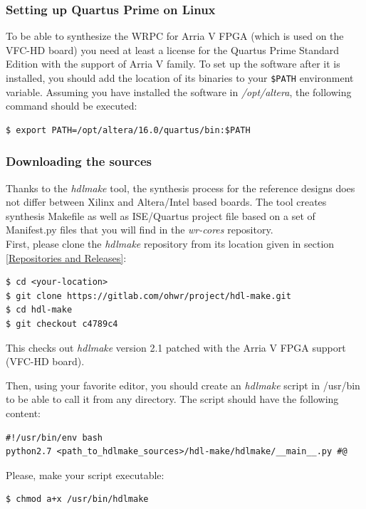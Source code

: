 \documentclass[a4paper, 12pt]{article}
\renewcommand{\_}{\underscore\allowbreak}
\begin{document}
\subsubsection{Setting up Quartus Prime on Linux}
\label{Setting up Quartus Prime}
To be able to synthesize the WRPC for Arria V FPGA (which is used on the VFC-HD
board) you need at least a license for the Quartus Prime Standard Edition with
the support of Arria V family. To set up the software after it is installed, you
should add the location of its binaries to your \texttt{\$PATH} environment
variable. Assuming you have installed the software in \textit{/opt/altera}, the
following command should be executed:
\begin{lstlisting}
$ export PATH=/opt/altera/16.0/quartus/bin:$PATH
\end{lstlisting}

\subsubsection{Downloading the sources}
Thanks to the \textit{hdlmake} tool, the synthesis process for the reference
designs does not differ between Xilinx and Altera/Intel based boards. The tool creates
synthesis Makefile as well as ISE/Quartus project file based on a set of
Manifest.py files that you will find in the \textit{wr-cores} repository.\\

First, please clone the \textit{hdlmake} repository from its location given in
section \ref{Repositories and Releases}:
\begin{lstlisting}
$ cd <your-location>
$ git clone https://gitlab.com/ohwr/project/hdl-make.git
$ cd hdl-make
$ git checkout c4789c4
\end{lstlisting}
This checks out \textit{hdlmake} version 2.1 patched with the Arria V FPGA
support (VFC-HD board).

Then, using your favorite editor, you should create an \textit{hdlmake} script in
/usr/bin to be able to call it from any directory. The script should have the
following content:
\begin{lstlisting}
#!/usr/bin/env bash
python2.7 <path_to_hdlmake_sources>/hdl-make/hdlmake/__main__.py #@
\end{lstlisting}

Please, make your script executable:
\begin{lstlisting}
$ chmod a+x /usr/bin/hdlmake
\end{lstlisting}
\end{document}
